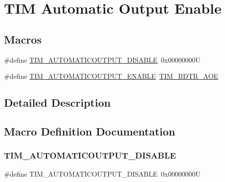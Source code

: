 \hypertarget{group___t_i_m___a_o_e___bit___set___reset}{}\section{T\+IM Automatic Output Enable}
\label{group___t_i_m___a_o_e___bit___set___reset}
\subsection*{Macros}
\begin{DoxyCompactItemize}
\item 
\#define \hyperlink{group___t_i_m___a_o_e___bit___set___reset_ga65b4336dee767fbe8d8cc4f980f6b18e}{T\+I\+M\+\_\+\+A\+U\+T\+O\+M\+A\+T\+I\+C\+O\+U\+T\+P\+U\+T\+\_\+\+D\+I\+S\+A\+B\+LE}~0x00000000U
\item 
\#define \hyperlink{group___t_i_m___a_o_e___bit___set___reset_ga09e7f3f768b0f122f13fd47771f07ddf}{T\+I\+M\+\_\+\+A\+U\+T\+O\+M\+A\+T\+I\+C\+O\+U\+T\+P\+U\+T\+\_\+\+E\+N\+A\+B\+LE}~\hyperlink{group___peripheral___registers___bits___definition_ga59f15008050f91fa3ecc9eaaa971a509}{T\+I\+M\+\_\+\+B\+D\+T\+R\+\_\+\+A\+OE}
\end{DoxyCompactItemize}


\subsection{Detailed Description}


\subsection{Macro Definition Documentation}
\mbox{\label{group___t_i_m___a_o_e___bit___set___reset_ga65b4336dee767fbe8d8cc4f980f6b18e}} 
\subsubsection{\texorpdfstring{T\+I\+M\+\_\+\+A\+U\+T\+O\+M\+A\+T\+I\+C\+O\+U\+T\+P\+U\+T\+\_\+\+D\+I\+S\+A\+B\+LE}{TIM\_AUTOMATICOUTPUT\_DISABLE}}
{\footnotesize\ttfamily \#define T\+I\+M\+\_\+\+A\+U\+T\+O\+M\+A\+T\+I\+C\+O\+U\+T\+P\+U\+T\+\_\+\+D\+I\+S\+A\+B\+LE~0x00000000U}

